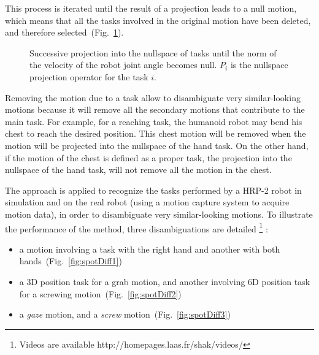 \documentclass[letterpaper, 10pt, conference]{ieeeconf}      %
\begin{document}
This process is iterated until the result of a projection leads to a null motion,
which means that all the tasks involved in the original motion
have been deleted, and therefore selected~(Fig.~\ref{fig:algorithm}).
\begin{figure}[t]
\begin{center}
\resizebox{.48\textwidth}{!} {
      
    }
\end{center}
\caption{Successive projection into the nullspace of tasks until the norm of the
	velocity of the robot joint angle becomes null. $P_i$ is the nullspace projection
	operator for the task $i$.}
\label{fig:algorithm}
\end{figure}

Removing the motion due to a task allow to disambiguate very similar-looking motions
because it will remove all the secondary motions that contribute to the main task.
For example, for a reaching task, the humanoid robot may bend his chest to
reach the desired position. This chest motion will be removed when the motion
will be projected into the nullspace of the hand task. On the other hand,
if the motion of the chest is defined as a proper task, the projection into the
nullspace of the hand task, will not remove all the motion in the chest.

The approach is applied to recognize the tasks performed by a HRP-2 robot in simulation
and on the real robot (using a motion capture system to acquire motion data), in order to
disambiguate very similar-looking motions. To illustrate the performance
of the method, three disambiguations are detailed
\footnote{Videos are available {http://homepages.laas.fr/shak/videos/}} :
\begin{itemize}
\item a motion involving a task with the right hand and another with both hands~(Fig.~\ref{fig:spotDiff1})
\item a 3D position task for a grab motion, and another involving 6D position 
task for a screwing motion~(Fig.~\ref{fig:spotDiff2})
\item a \emph{gaze} motion, and a \emph{screw} motion~(Fig.~\ref{fig:spotDiff3})
\end{itemize}
\end{document}
